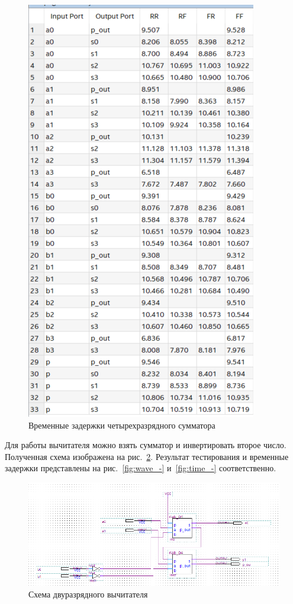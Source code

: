 \documentclass[a4paper,14pt]{article}
\begin{document}
\begin{figure}[H]
	\centering
	\includegraphics[width=0.6\linewidth]{image/time_4}
	\caption{Временные задержки четырехразрядного сумматора}
	\label{fig:time_4}
\end{figure}

Для работы вычитателя можно взять сумматор и инвертировать второе число.
Полученная схема изображена на рис.~\ref{fig:schema_-}.
Результат тестирования и временные задержки представлены на рис.~\ref{fig:wave_-} и~\ref{fig:time_-} соответственно.

\begin{figure}[H]
	\centering
	\includegraphics[width=\linewidth]{image/schema_-}
	\caption{Схема двуразрядного вычитателя}
	\label{fig:schema_-}
\end{figure}
\end{document}
